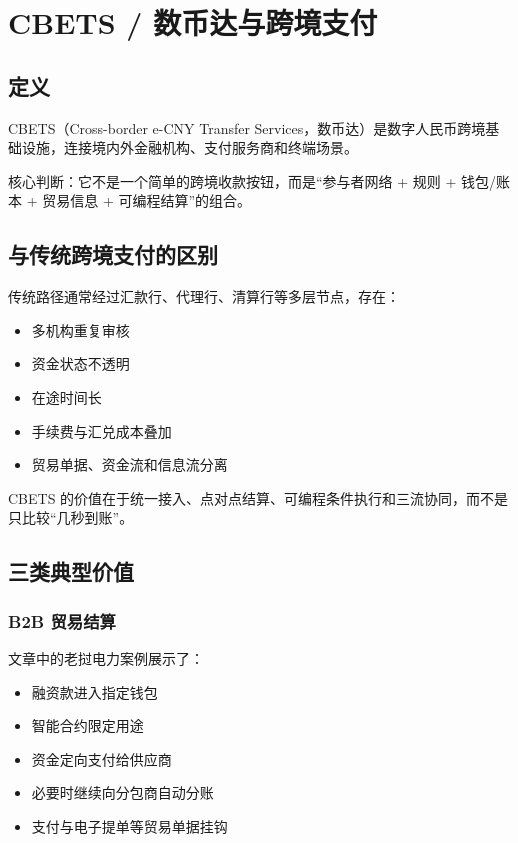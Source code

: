 \chapter{CBETS /
数币达与跨境支付}\label{cbets--ux6570ux5e01ux8fbeux4e0eux8de8ux5883ux652fux4ed8}

\section{定义}\label{ux5b9aux4e49}

CBETS（Cross-border e-CNY Transfer
Services，数币达）是数字人民币跨境基础设施，连接境内外金融机构、支付服务商和终端场景。

核心判断：它不是一个简单的跨境收款按钮，而是``参与者网络 + 规则 + 钱包/账本 +
贸易信息 + 可编程结算''的组合。

\section{与传统跨境支付的区别}\label{ux4e0eux4f20ux7edfux8de8ux5883ux652fux4ed8ux7684ux533aux522b}

传统路径通常经过汇款行、代理行、清算行等多层节点，存在：

\begin{itemize}
\tightlist
\item
  多机构重复审核
\item
  资金状态不透明
\item
  在途时间长
\item
  手续费与汇兑成本叠加
\item
  贸易单据、资金流和信息流分离
\end{itemize}

CBETS
的价值在于统一接入、点对点结算、可编程条件执行和三流协同，而不是只比较``几秒到账''。

\section{三类典型价值}\label{ux4e09ux7c7bux5178ux578bux4ef7ux503c}

\subsection{B2B 贸易结算}\label{b2b-ux8d38ux6613ux7ed3ux7b97}

文章中的老挝电力案例展示了：

\begin{itemize}
\tightlist
\item
  融资款进入指定钱包
\item
  智能合约限定用途
\item
  资金定向支付给供应商
\item
  必要时继续向分包商自动分账
\item
  支付与电子提单等贸易单据挂钩
\end{itemize}

